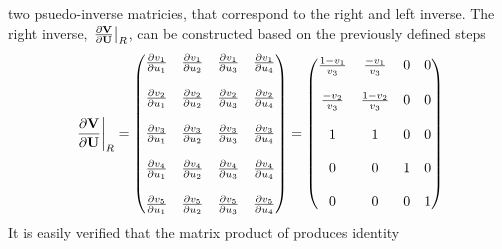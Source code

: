 two psuedo-inverse matricies, that correspond to the right and left inverse.
The right inverse, $\left. \frac{\partial \mathbf V}{\partial \mathbf U}\right|_{R}$, can be constructed based on the previously
defined steps
\begin{equation}
  \left. \frac{\partial \mathbf V}{\partial \mathbf U}\right|_{R} = 
  \begin{pmatrix}
    \frac{\partial v_1}{\partial u_1} & \frac{\partial v_1}{\partial u_2} & \frac{\partial v_1}{\partial u_3} & \frac{\partial v_1}{\partial u_4} \\ \\
    \frac{\partial v_2}{\partial u_1} & \frac{\partial v_2}{\partial u_2} & \frac{\partial v_2}{\partial u_3} & \frac{\partial v_2}{\partial u_4} \\ \\
    \frac{\partial v_3}{\partial u_1} & \frac{\partial v_3}{\partial u_2} & \frac{\partial v_3}{\partial u_3} & \frac{\partial v_3}{\partial u_4} \\ \\
    \frac{\partial v_4}{\partial u_1} & \frac{\partial v_4}{\partial u_2} & \frac{\partial v_4}{\partial u_3} & \frac{\partial v_4}{\partial u_4} \\ \\
    \frac{\partial v_5}{\partial u_1} & \frac{\partial v_5}{\partial u_2} & \frac{\partial v_5}{\partial u_3} & \frac{\partial v_5}{\partial u_4} 
  \end{pmatrix}
  =
  \begin{pmatrix}
    \frac{1-v_1}{v_3} & \frac{-v_1}{v_3}  & 0 & 0 \\ \\
    \frac{-v_2}{v_3}  & \frac{1-v_2}{v_3} & 0 & 0 \\ \\
    1                 & 1                 & 0 & 0 \\ \\
    0                 & 0                 & 1 & 0 \\ \\
    0                 & 0                 & 0 & 1
  \end{pmatrix}
  \label{dvdu-jac-right}
\end{equation}
It is easily verified that the matrix product of
 produces identity
